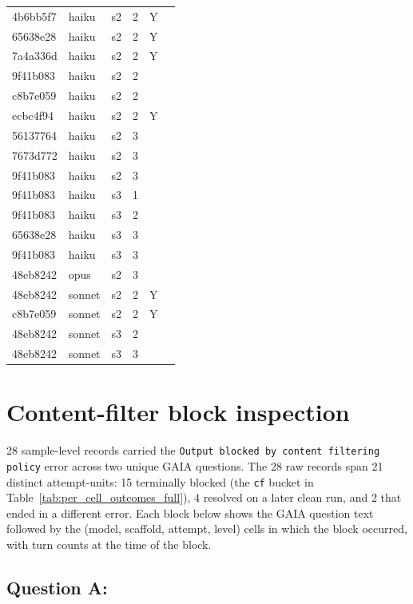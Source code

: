 \documentclass[10pt]{article} %
\begin{document}
\begin{table}[t]
\begin{center}
\begin{tabular}{llrrcc}
        4b6bb5f7 &haiku &s2 &2 &Y & \\
        65638e28 &haiku &s2 &2 &Y & \\
        7a4a336d &haiku &s2 &2 &Y & \\
        9f41b083 &haiku &s2 &2 & & \\
        c8b7e059 &haiku &s2 &2 & & \\
        ecbc4f94 &haiku &s2 &2 &Y & \\
        56137764 &haiku &s2 &3 & & \\
        7673d772 &haiku &s2 &3 & & \\
        9f41b083 &haiku &s2 &3 & & \\
        9f41b083 &haiku &s3 &1 & & \\
        9f41b083 &haiku &s3 &2 & & \\
        65638e28 &haiku &s3 &3 & & \\
        9f41b083 &haiku &s3 &3 & & \\
        48eb8242 &opus &s2 &3 & & \\
        48eb8242 &sonnet &s2 &2 &Y & \\
        c8b7e059 &sonnet &s2 &2 &Y & \\
        48eb8242 &sonnet &s3 &2 & & \\
        48eb8242 &sonnet &s3 &3 & & \\
    \end{tabular}
    \end{center}
    \end{table}

\FloatBarrier

\section{Content-filter block inspection}\label{app:content_filter_inspection}

    28 sample-level records carried the \texttt{Output blocked by content filtering policy} error across two unique GAIA questions. The 28 raw records span 21 distinct attempt-units: 15 terminally blocked (the \texttt{cf} bucket in Table~\ref{tab:per_cell_outcomes_full}), 4 resolved on a later clean run, and 2 that ended in a different error. Each block below shows the GAIA question text followed by the (model, scaffold, attempt, level) cells in which the block occurred, with turn counts at the time of the block.

    \subsection{Question A:}
    
\end{document}

